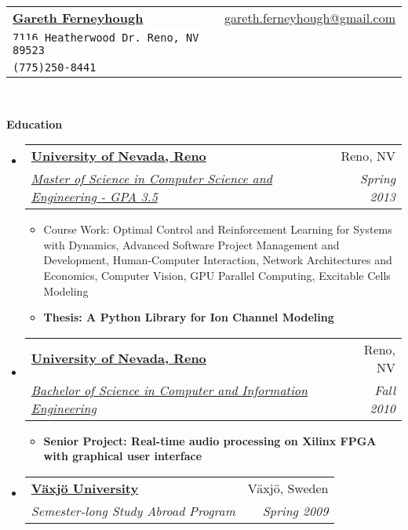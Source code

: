 \documentclass[letterpaper,11pt]{article}
\makeatletter
\newcommand{\resitem}[1]{\item #1 \vspace{-2pt}}
\newcommand{\resheading}[1]{{\large \colorbox{mygrey}{\begin{minipage}{\textwidth}{\textbf{#1 \vphantom{p\^{E}}}}\end{minipage}}}}
\newcommand{\ressubheading}[4]{
\begin{tabular*}{6.5in}{l@{\extracolsep{\fill}}r}
		\textbf{#1} & #2 \\
		\textit{#3} & \textit{#4} \\
\end{tabular*}\vspace{-6pt}}
\makeatother
\begin{document}
\newcommand{\mywebheader}{
\begin{tabular*}{7in}{l@{\extracolsep{\fill}}r}
	\textbf{\href{http://gferneyhough.com/}{\LARGE Gareth Ferneyhough}} & \href{mailto:gareth.ferneyhough@gmail.com}{gareth.ferneyhough@gmail.com}\\
	{\footnotesize \texttt{\colorbox{white}{7116 Heatherwood Dr. Reno, NV 89523}}} &  \\
	{\footnotesize \texttt{\colorbox{white}{(775)250-8441}}}
	\end{tabular*}
\\
\vspace{0.1in}}

\mywebheader

\resheading{Education}
	\begin{itemize}
		\item
			\ressubheading{\href{http://www.unr.edu/}{University of Nevada, Reno}}{Reno, NV}{\href{http://www.cse.unr.edu/academics/graduate/cesms.html}{Master of Science in Computer Science and Engineering - GPA 3.5}}{Spring 2013}
				{ \footnotesize
				\begin{itemize}
				  \resitem{Course Work: Optimal Control and Reinforcement Learning for Systems with Dynamics, Advanced Software Project Management and Development, Human-Computer Interaction, Network Architectures and Economics, Computer Vision, GPU Parallel Computing, Excitable Cells Modeling}  
				  \resitem{\textbf{Thesis: A Python Library for Ion Channel Modeling}}
				\end{itemize}
				}
		\item
			\ressubheading{\href{http://www.unr.edu/}{University of Nevada, Reno}}{Reno, NV}{\href{http://www.cse.unr.edu/academics/undergraduate/ciebs.html}{Bachelor of Science in Computer and Information Engineering}}{Fall 2010}
				{ \footnotesize
				\begin{itemize}
				  \resitem{\textbf{Senior Project: Real-time audio processing on Xilinx FPGA with graphical user interface}}
				\end{itemize}
				}
		\item
			\ressubheading{\href{http://lnu.se/?l=en}{V\"{a}xj\"{o} University}}{V\"{a}xj\"{o}, Sweden}{Semester-long Study Abroad Program}{Spring 2009}
	\end{itemize} %
\end{document}
